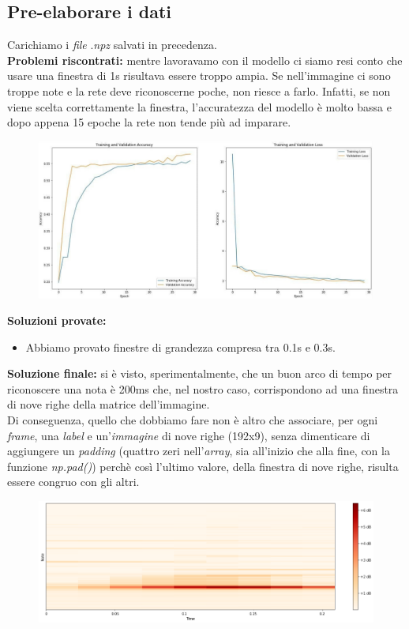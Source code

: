 \subsection{Pre-elaborare i dati}
Carichiamo i \textit{file} .\textit{npz} salvati in precedenza.\\
\newline
\textbf{Problemi riscontrati:} mentre lavoravamo con il modello ci siamo resi conto che usare una finestra di 1s risultava essere troppo ampia. Se nell'immagine ci sono troppe note e la rete deve riconoscerne poche, non riesce a farlo. Infatti, se non viene scelta  correttamente la finestra, l'accuratezza del modello è molto bassa e dopo appena 15 epoche la rete non tende più ad imparare.
\begin{figure}[H]
	\centering
	\includegraphics[scale=0.5]{./images/img28.jpg}
\end{figure}
\textbf{Soluzioni provate:}
\begin{itemize}
	\item Abbiamo provato finestre di grandezza compresa tra 0.1s e 0.3s.
\end{itemize}
\textbf{Soluzione finale:} si è visto, sperimentalmente, che un buon arco di tempo per riconoscere una nota è 200ms che, nel nostro caso, corrispondono ad una finestra di nove righe della matrice dell'immagine.\\
\newline
Di conseguenza, quello che dobbiamo fare non è altro che associare, per ogni \textit{frame}, una \textit{label} e un'\textit{immagine} di nove righe (192x9), senza dimenticare di aggiungere un \textit{padding} (quattro zeri nell'\textit{array}, sia all'inizio che alla fine, con la funzione \textit{np.pad()}) perchè così l'ultimo valore, della finestra di nove righe, risulta essere congruo con gli altri.\\
\newline
\begin{figure}[H]
	\centering
	\includegraphics[scale=0.40]{./images/img8.png}
\end{figure}
